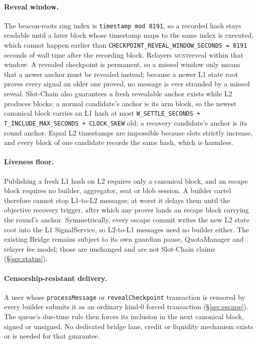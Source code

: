 \documentclass[a4paper,11pt]{article}
\newcommand{\code}[1]{\nolinkurl{#1}}
\newcommand{\must}{\textsc{must}}
\begin{document}
\paragraph{Reveal window.}  The beacon-roots ring index is
\code{timestamp mod 8191}, so a recorded hash stays readable until a later
block whose timestamp maps to the same index is executed, which cannot happen
earlier than \code{CHECKPOINT_REVEAL_WINDOW_SECONDS = 8191} seconds of wall
time after the recording block.  Relayers \must reveal within that window.  A
revealed checkpoint is permanent, so a missed window only means that a newer
anchor must be revealed instead; because a newer L1 state root proves every
signal an older one proved, no message is ever stranded by a missed reveal.
Slot-Chain also guarantees a fresh revealable anchor exists while L2 produces
blocks: a normal candidate's anchor is its arm block, so the newest canonical
block carries an L1 hash at most
\code{W_SETTLE_SECONDS + T_INCLUDE_MAX_SECONDS + CLOCK_SKEW} old; a recovery
candidate's anchor is its round anchor.  Equal L2 timestamps are impossible
because slots strictly increase, and every block of one candidate records the
same hash, which is harmless.

\paragraph{Liveness floor.}  Publishing a fresh L1 hash on L2 requires only a
canonical block, and an escape block requires no builder, aggregator, seat or
blob session.  A builder cartel therefore cannot stop L1-to-L2 messages; at
worst it delays them until the objective recovery trigger, after which any
prover lands an escape block carrying the round's anchor.  Symmetrically,
every escape commit writes the new L2 state root into the L1 SignalService, so
L2-to-L1 messages need no builder either.  The existing Bridge remains
subject to its own guardian pause, QuotaManager and relayer fee model; those
are unchanged and are not Slot-Chain claims (\S\ref{sec:status}).

\paragraph{Censorship-resistant delivery.}  A user whose \code{processMessage}
or \code{revealCheckpoint} transaction is censored by every builder submits it
as an ordinary kind-0 forced transaction (\S\ref{sec:escape}).  The queue's
due-time rule then forces its inclusion in the next canonical block, signed or
unsigned.  No dedicated bridge lane, credit or liquidity mechanism exists or is
needed for that guarantee.
\end{document}

